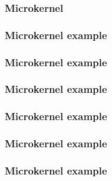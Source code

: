 {%

\begin{frame}
  \frametitle{Microkernel}

  \begin{center}
  \end{center}
\end{frame}


\begin{frame}
  \frametitle{Microkernel example}

  \begin{center}
  \end{center}
\end{frame}

\begin{frame}
  \frametitle{Microkernel example}

  \begin{center}
  \end{center}
\end{frame}

\begin{frame}
  \frametitle{Microkernel example}

  \begin{center}
  \end{center}
\end{frame}

\begin{frame}
  \frametitle{Microkernel example}

  \begin{center}
  \end{center}
\end{frame}

\begin{frame}
  \frametitle{Microkernel example}

  \begin{center}
  \end{center}
\end{frame}

\begin{frame}
  \frametitle{Microkernel example}

  \begin{center}
  \end{center}
\end{frame}

}
